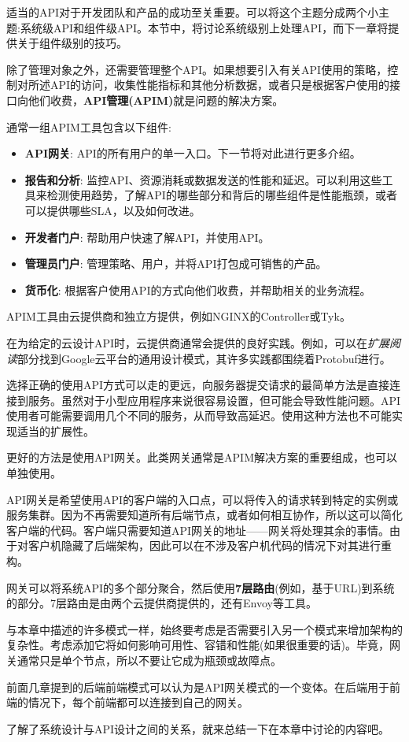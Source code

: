 
适当的API对于开发团队和产品的成功至关重要。可以将这个主题分成两个小主题:系统级API和组件级API。本节中，将讨论系统级别上处理API，而下一章将提供关于组件级别的技巧。

除了管理对象之外，还需要管理整个API。如果想要引入有关API使用的策略，控制对所述API的访问，收集性能指标和其他分析数据，或者只是根据客户使用的接口向他们收费，\textbf{API管理(APIM)}就是问题的解决方案。

通常一组APIM工具包含以下组件:

\begin{itemize}
\item 
\textbf{API网关}: API的所有用户的单一入口。下一节将对此进行更多介绍。

\item 
\textbf{报告和分析}: 监控API、资源消耗或数据发送的性能和延迟。可以利用这些工具来检测使用趋势，了解API的哪些部分和背后的哪些组件是性能瓶颈，或者可以提供哪些SLA，以及如何改进。

\item 
\textbf{开发者门户}: 帮助用户快速了解API，并使用API。

\item 
\textbf{管理员门户}: 管理策略、用户，并将API打包成可销售的产品。

\item  
\textbf{货币化}: 根据客户使用API的方式向他们收费，并帮助相关的业务流程。
\end{itemize}

APIM工具由云提供商和独立方提供，例如NGINX的Controller或Tyk。

在为给定的云设计API时，云提供商通常会提供的良好实践。例如，可以在\textit{扩展阅读}部分找到Google云平台的通用设计模式，其许多实践都围绕着Protobuf进行。

选择正确的使用API方式可以走的更远，向服务器提交请求的最简单方法是直接连接到服务。虽然对于小型应用程序来说很容易设置，但可能会导致性能问题。API使用者可能需要调用几个不同的服务，从而导致高延迟。使用这种方法也不可能实现适当的扩展性。

更好的方法是使用API网关。此类网关通常是APIM解决方案的重要组成，也可以单独使用。


API网关是希望使用API的客户端的入口点，可以将传入的请求转到特定的实例或服务集群。因为不再需要知道所有后端节点，或者如何相互协作，所以这可以简化客户端的代码。客户端只需要知道API网关的地址——网关将处理其余的事情。由于对客户机隐藏了后端架构，因此可以在不涉及客户机代码的情况下对其进行重构。

网关可以将系统API的多个部分聚合，然后使用\textbf{7层路由}(例如，基于URL)到系统的部分。7层路由是由两个云提供商提供的，还有Envoy等工具。

与本章中描述的许多模式一样，始终要考虑是否需要引入另一个模式来增加架构的复杂性。考虑添加它将如何影响可用性、容错和性能(如果很重要的话)。毕竟，网关通常只是单个节点，所以不要让它成为瓶颈或故障点。

前面几章提到的后端前端模式可以认为是API网关模式的一个变体。在后端用于前端的情况下，每个前端都可以连接到自己的网关。

了解了系统设计与API设计之间的关系，就来总结一下在本章中讨论的内容吧。











